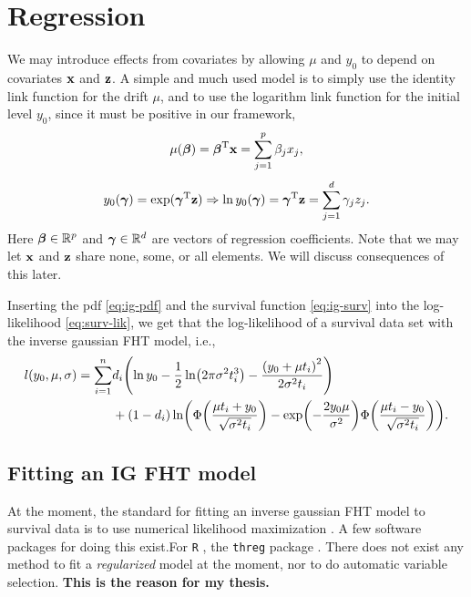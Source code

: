 \section{Regression}\label{subsec:IG-reg}
We may introduce effects from covariates by allowing $\mu$ and $y_0$ to depend on covariates $\mathbf{x}$ and $\mathbf{z}$. A simple and much used model
\citep{leewhitmore2006, caroni2017}
is to simply use the identity link function for the drift $\mu$, and to use the logarithm link function for the initial level $y_0$, since it must be positive in our framework,
\begin{equation}\label{eq:y0}
    \mu(\boldsymbol{\beta})=\boldsymbol{\beta}^{\text{T}}\mathbf{x}=\sum_{j=1}^p \beta_jx_j,
\end{equation}
\begin{equation}\label{eq:mu}
    y_0(\boldsymbol{\gamma})=\exp(\boldsymbol{\gamma}^{\text{T}}\mathbf{z})\Rightarrow\ln y_0(\boldsymbol{\gamma})=\boldsymbol{\gamma}^{\text{T}}\mathbf{z}=\sum_{j=1}^d \gamma_jz_j.
\end{equation}
Here $\boldsymbol{\beta}\in\mathbb{R}^p$ and $\boldsymbol{\gamma}\in\mathbb{R}^d$ are vectors of regression coefficients. Note that we may let $\mathbf{x}$ and $\mathbf{z}$ share none, some, or all elements. We will discuss consequences of this later.

Inserting the pdf \eqref{eq:ig-pdf} and the survival function \eqref{eq:ig-surv} into the log-likelihood \eqref{eq:surv-lik}, we get that the log-likelihood of a survival data set with the inverse gaussian FHT model, i.e.,
\begin{align}\label{eq:loglik}
\begin{split}
    l(y_0,\mu,\sigma)=\sum_{i=1}^n&d_i\p*{\ln y_0-\frac{1}{2}\ln\p*{2\pi\sigma^2\ti^3}-\frac{\p*{y_0+\mu\ti}^2}{2\sigma^2\ti}} \\
    &+
    (1-d_i)\ln\p*{\Phi\p*{\frac{\mu\ti+y_0}{\sqrt{\sigma^2\ti}}}-\exp\p*{-\frac{2y_0\mu}{\sigma^2}}\Phi\p*{\frac{\mu\ti-y_0}{\sqrt{\sigma^2\ti}}}}.
\end{split}
\end{align}

\subsection{Fitting an IG FHT model}
At the moment, the standard for fitting an inverse gaussian FHT model to survival data is to use numerical likelihood maximization \citep{caroni2017}. A few software packages for doing this exist.For \verb|R| \citep{Rlang}, the \verb|threg| package \citep{threg}. There does not exist any method to fit a \textit{regularized} model at the moment, nor to do automatic variable selection. \textbf{This is the reason for my thesis.}

